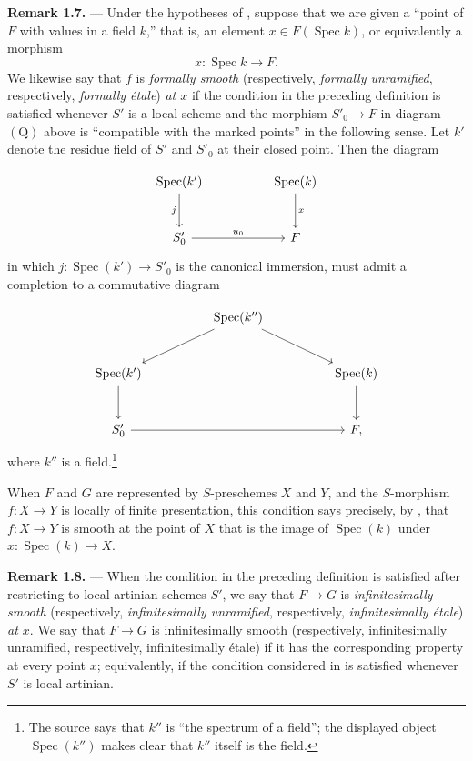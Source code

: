 
\medskip
\noindent{}\textbf{Remark 1.7.} ---
Under the hypotheses of , suppose that we are given a ``point of
\(F\) with values in a field \(k\),'' that is, an element
\(x\in F(\operatorname{Spec}k)\), or equivalently a morphism
\[
  x:\operatorname{Spec}k\longrightarrow F.
\]
We likewise say that \(f\) is \emph{formally smooth} (respectively,
\emph{formally unramified}, respectively, \emph{formally étale})
\emph{at \(x\)} if the condition in the preceding definition is
satisfied whenever \(S'\) is a local scheme and the morphism
\(S'_0\to F\) in diagram \(\mathrm{(Q)}\) above is ``compatible with
the marked points'' in the following sense.  Let \(k'\) denote the
residue field of \(S'\) and \(S'_0\) at their closed point.  Then the
diagram

\[
\begin{tikzcd}[column sep=huge,row sep=large]
  \operatorname{Spec}(k') \arrow[d,"j"'] &
    \operatorname{Spec}(k) \arrow[d,"x"] \\
  S'_0 \arrow[r,"u_0"] & F
\end{tikzcd}
\]
in which \(j:\operatorname{Spec}(k')\to S'_0\) is the canonical
immersion, must admit a completion to a commutative diagram

\[
\begin{tikzcd}[column sep=huge,row sep=large]
  & \operatorname{Spec}(k'') \arrow[dl] \arrow[dr] & \\
  \operatorname{Spec}(k') \arrow[d] &&
    \operatorname{Spec}(k) \arrow[d] \\
  S'_0 \arrow[rr] && F ,
\end{tikzcd}
\]
where \(k''\) is a field.\footnote{The source says that \(k''\) is
``the spectrum of a field''; the displayed object
\(\operatorname{Spec}(k'')\) makes clear that \(k''\) itself is the
field.}

When \(F\) and \(G\) are represented by \(S\)-preschemes \(X\) and
\(Y\), and the \(S\)-morphism \(f:X\to Y\) is locally of finite
presentation, this condition says precisely, by , that
\(f:X\to Y\) is smooth at the point of \(X\) that is the image of
\(\operatorname{Spec}(k)\) under
\(x:\operatorname{Spec}(k)\to X\).

\medskip
\noindent{}\textbf{Remark 1.8.} ---
When the condition in the preceding definition is satisfied after
restricting to local artinian schemes \(S'\), we say that
\(F\to G\) is \emph{infinitesimally smooth} (respectively,
\emph{infinitesimally unramified}, respectively,
\emph{infinitesimally étale}) \emph{at \(x\)}.  We say that
\(F\to G\) is infinitesimally smooth (respectively,
infinitesimally unramified, respectively, infinitesimally étale) if
it has the corresponding property at every point \(x\); equivalently,
if the condition considered in  is satisfied whenever \(S'\) is
local artinian.

